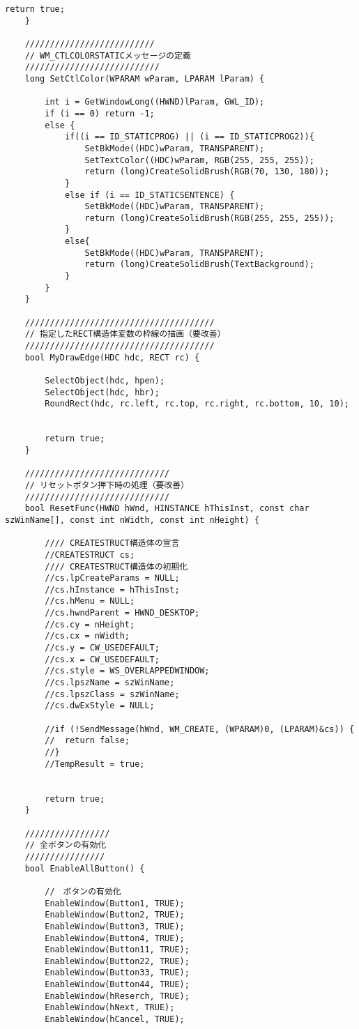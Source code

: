 \begin{lstlisting}[caption=main.cpp]
		return true;
	}
	
	//////////////////////////
	// WM_CTLCOLORSTATICメッセージの定義
	///////////////////////////
	long SetCtlColor(WPARAM wParam, LPARAM lParam) {
	
		int i = GetWindowLong((HWND)lParam, GWL_ID);
		if (i == 0) return -1;
		else {
			if((i == ID_STATICPROG) || (i == ID_STATICPROG2)){
				SetBkMode((HDC)wParam, TRANSPARENT);
				SetTextColor((HDC)wParam, RGB(255, 255, 255));
				return (long)CreateSolidBrush(RGB(70, 130, 180));
			}
			else if (i == ID_STATICSENTENCE) {
				SetBkMode((HDC)wParam, TRANSPARENT);
				return (long)CreateSolidBrush(RGB(255, 255, 255));
			}
			else{
				SetBkMode((HDC)wParam, TRANSPARENT);
				return (long)CreateSolidBrush(TextBackground);
			}	
		}
	}
	
	//////////////////////////////////////
	// 指定したRECT構造体変数の枠線の描画（要改善）
	//////////////////////////////////////
	bool MyDrawEdge(HDC hdc, RECT rc) {
		
		SelectObject(hdc, hpen);
		SelectObject(hdc, hbr);
		RoundRect(hdc, rc.left, rc.top, rc.right, rc.bottom, 10, 10);
		
	
		return true;
	}
	
	/////////////////////////////
	// リセットボタン押下時の処理（要改善）
	/////////////////////////////
	bool ResetFunc(HWND hWnd, HINSTANCE hThisInst, const char szWinName[], const int nWidth, const int nHeight) {
	
		//// CREATESTRUCT構造体の宣言
		//CREATESTRUCT cs;
		//// CREATESTRUCT構造体の初期化
		//cs.lpCreateParams = NULL;
		//cs.hInstance = hThisInst;
		//cs.hMenu = NULL;
		//cs.hwndParent = HWND_DESKTOP;
		//cs.cy = nHeight;
		//cs.cx = nWidth;
		//cs.y = CW_USEDEFAULT;
		//cs.x = CW_USEDEFAULT;
		//cs.style = WS_OVERLAPPEDWINDOW;
		//cs.lpszName = szWinName;
		//cs.lpszClass = szWinName;
		//cs.dwExStyle = NULL;
	
		//if (!SendMessage(hWnd, WM_CREATE, (WPARAM)0, (LPARAM)&cs)) {
		//	return false;
		//}
		//TempResult = true;
	
	
		return true;
	}
	
	/////////////////
	// 全ボタンの有効化
	////////////////
	bool EnableAllButton() {
	
		//　ボタンの有効化
		EnableWindow(Button1, TRUE);
		EnableWindow(Button2, TRUE);
		EnableWindow(Button3, TRUE);
		EnableWindow(Button4, TRUE);
		EnableWindow(Button11, TRUE);
		EnableWindow(Button22, TRUE);
		EnableWindow(Button33, TRUE);
		EnableWindow(Button44, TRUE);
		EnableWindow(hReserch, TRUE);
		EnableWindow(hNext, TRUE);
		EnableWindow(hCancel, TRUE);
	

\end{lstlisting}
